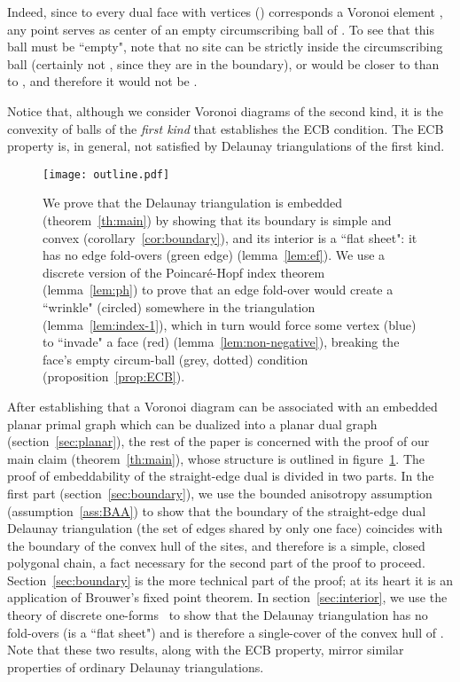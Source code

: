 \documentclass[11pt]{article}
\begin{document}
Indeed, since to every dual face  with vertices  () corresponds 
	a Voronoi element , 
	any point  serves as center of an empty circumscribing ball of . 
To see that this ball must be ``empty", note that 
no site  can be strictly inside the circumscribing ball (certainly not , since they are in the boundary), 
	or  would be closer to  than to , 
	and therefore it would not be . 

Notice that, although we consider Voronoi diagrams of the second kind, 
	it is the convexity of balls of the \emph{first kind} that establishes the ECB condition. 
The ECB property is, in general, not satisfied by Delaunay triangulations of the first kind. 

\begin{figure}[htbp]
\begin{center}
\texttt{[image: outline.pdf]}
\caption{
	We prove that the Delaunay triangulation is embedded (theorem~\ref{th:main}) 
	by showing that its boundary is simple and convex (corollary~\ref{cor:boundary}), 
		and its interior is a ``flat sheet": it has no edge fold-overs (green edge) (lemma~\ref{lem:ef}).  
	We use a discrete version of the Poincar\'e-Hopf index theorem (lemma~\ref{lem:ph}) to prove that  
		an edge fold-over would create a ``wrinkle" (circled) somewhere in the triangulation (lemma~\ref{lem:index-1}), 
		which in turn would force some vertex (blue) to ``invade" a face (red) (lemma~\ref{lem:non-negative}), 
		breaking the face's empty circum-ball (grey, dotted) condition (proposition~\ref{prop:ECB}).}
\label{fig:outline}
\end{center}
\end{figure}

After establishing that a Voronoi diagram can be associated with an embedded planar primal graph 
	which can be dualized into a planar dual graph (section~\ref{sec:planar}), 
	the rest of the paper is concerned with the proof of our main claim (theorem~\ref{th:main}), 
	whose structure is outlined in figure~\ref{fig:outline}. 
The proof of embeddability of the straight-edge dual is divided in two parts. 
In the first part (section~\ref{sec:boundary}), we use the bounded anisotropy assumption (assumption~\ref{ass:BAA})
	to show that the 
	 boundary of the straight-edge dual Delaunay triangulation 
	(the set of edges shared by only one face) coincides with the boundary of the convex hull of the sites, 
	and therefore is a simple, closed polygonal chain, a fact necessary for the second part of the proof to proceed. 
	Section~\ref{sec:boundary} is the more technical part of the proof; at its heart it is an application of Brouwer's fixed point theorem. 
In section~\ref{sec:interior}, we use the theory of discrete one-forms~\cite{1form} 
	to show that the Delaunay triangulation has no fold-overs (is a ``flat sheet") 
	and is therefore a single-cover of the convex hull of . 
Note that these two results, along with the ECB property, mirror similar properties of ordinary Delaunay triangulations. 
\end{document}
